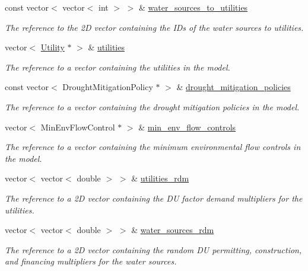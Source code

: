 \begin{DoxyCompactItemize}
const vector$<$ vector$<$ int $>$ $>$ \& \mbox{\hyperlink{classSimulation_ab2825b5561679583c89a3936ce7dea39}{water\+\_\+sources\+\_\+to\+\_\+utilities}}
\begin{DoxyCompactList}\small\item\em The reference to the 2D vector containing the I\+Ds of the water sources to utilities. \end{DoxyCompactList}\item 
vector$<$ \mbox{\hyperlink{classUtility}{Utility}} $\ast$ $>$ \& \mbox{\hyperlink{classSimulation_a0de77bedebd4b324d334340b11f5afa6}{utilities}}
\begin{DoxyCompactList}\small\item\em The reference to a vector containing the utilities in the model. \end{DoxyCompactList}\item 
const vector$<$ Drought\+Mitigation\+Policy $\ast$ $>$ \& \mbox{\hyperlink{classSimulation_a23df9c17244a1cde0e32b42829623724}{drought\+\_\+mitigation\+\_\+policies}}
\begin{DoxyCompactList}\small\item\em The reference to a vector containing the drought mitigation policies in the model. \end{DoxyCompactList}\item 
vector$<$ Min\+Env\+Flow\+Control $\ast$ $>$ \& \mbox{\hyperlink{classSimulation_a91d4cbb85145e9ebb5a9cb5d24dace15}{min\+\_\+env\+\_\+flow\+\_\+controls}}
\begin{DoxyCompactList}\small\item\em The reference to a vector containing the minimum environmental flow controls in the model. \end{DoxyCompactList}\item 
vector$<$ vector$<$ double $>$ $>$ \& \mbox{\hyperlink{classSimulation_a0e0766513f36e2e95e83b0611c3c078c}{utilities\+\_\+rdm}}
\begin{DoxyCompactList}\small\item\em The reference to a 2D vector containing the DU factor demand multipliers for the utilities. \end{DoxyCompactList}\item 
vector$<$ vector$<$ double $>$ $>$ \& \mbox{\hyperlink{classSimulation_afd35d5f1a11036d7c64668274ba0cc20}{water\+\_\+sources\+\_\+rdm}}
\begin{DoxyCompactList}\small\item\em The reference to a 2D vector containing the random DU permitting, construction, and financing multipliers for the water sources. \end{DoxyCompactList}\item 

\end{DoxyCompactItemize}
